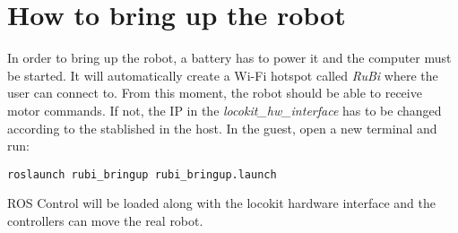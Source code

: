 \section{How to bring up the robot} %
\label{sec:how_to_bring_up_the_robot}
In order to bring up the robot, a battery has to power it and the computer must be started.
It will automatically create a Wi-Fi hotspot called \textit{RuBi} where the user can connect to.
From this moment, the robot should be able to receive motor commands.
If not, the IP in the \textit{locokit_hw_interface} has to be changed according to the stablished in the host.
In the guest, open a new terminal and run:
\begin{lstlisting}
roslaunch rubi_bringup rubi_bringup.launch
\end{lstlisting}
ROS Control will be loaded along with the locokit hardware interface and the controllers can move the real robot.
